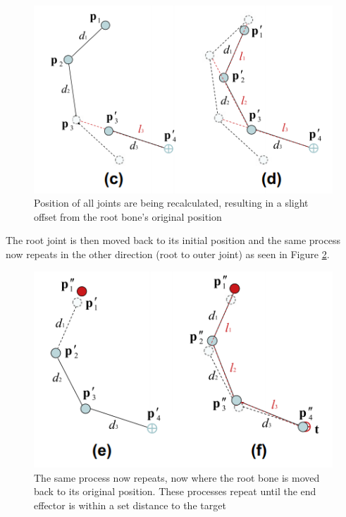 \begin{figure}[hbtp]
\centering
\includegraphics[width=1\textwidth]{FABRIK/cd}
\caption{Position of all joints are being recalculated, resulting in a slight offset from the root bone's original position}
\label{fig:cd}
\end{figure}

The root joint is then moved back to its initial position and the same process now repeats in the other direction (root to outer joint) as seen in Figure \ref{fig:ef}.

\begin{figure}[hbtp]
 \centering
 \includegraphics[width=1\textwidth]{FABRIK/ef}
 \caption{The same process now repeats, now where the root bone is moved back to its original position. These processes repeat until the end effector is within a set distance to the target}
 \label{fig:ef}
 \end{figure}
  
